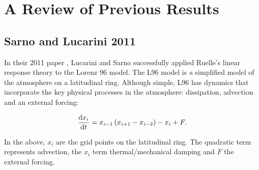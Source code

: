 \section{A Review of Previous Results}

\subsection{Sarno and Lucarini 2011}

In their 2011 paper \cite{Lucarini2011}, Lucarini and Sarno successfully applied Ruelle's linear response theory to the Lorenz 96 model. The L96 model is a simplified model of the atmosphere on a latitudinal ring. Although simple, L96 has dynamics that incorporate the key physical processes in the atmosphere: dissipation, advection and an external forcing: 

\begin{align}
\dv{x_i}{t} = x_{i-1} \left( x_{i+1} - x_{i-2} \right) - x_i + F.
\end{align} 

\noindent In the above, $x_i$ are the grid points on the latitudinal ring. The quadratic term represents advection, the $x_i$ term thermal/mechanical damping and $F$ the external forcing. 